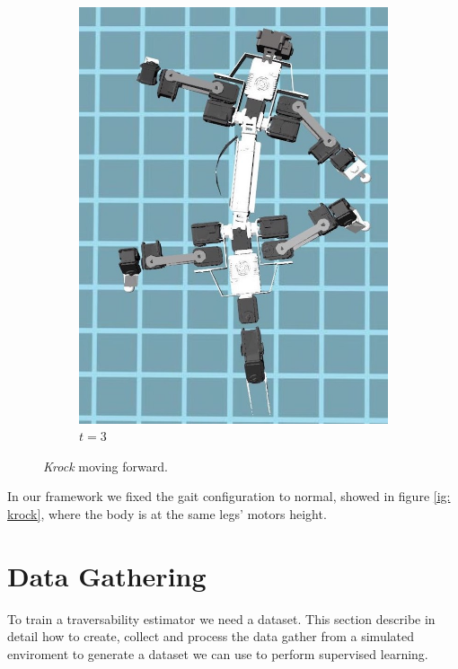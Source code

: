 \documentclass[../document.tex]{subfiles}
\begin{document}
\begin{figure}[H]
\begin{subfigure}[b]{0.3\textwidth}
			\includegraphics[width=\textwidth]{../img/krock-moving-3}
			\caption{$t=3$}
	    \end{subfigure}	
    \caption{\emph{Krock} moving forward.}
    \label{fig: krock-moving}
	\end{figure}
In our framework we fixed the gait configuration to normal, showed in figure \ref{ig: krock}, where the body is at the same legs' motors height.
\section{Data Gathering}
\label{sec: data-gathering}
To train a traversability estimator we need a dataset. This section describe in detail how to create, collect and process the data gather from a simulated enviroment to generate a dataset we can use to perform supervised learning.
\end{document}
